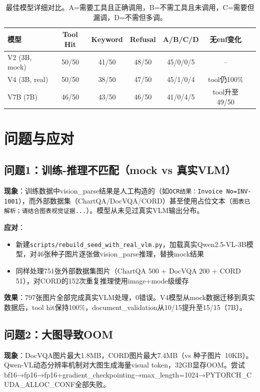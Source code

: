 \documentclass[fontset=none,11pt,a4paper]{ctexart}
\begin{document}
\begin{table}[htbp]
\centering
\begin{tabular}{lcccccl}
\toprule
模型 & Tool Hit & Keyword & Refusal & A/B/C/D & 无enf变化 \\
\midrule
V2 (3B, mock) & 50/50 & 41/50 & 48/50 & 45/0/0/5 & -- \\
V4 (3B, real) & 50/50 & 38/50 & 47/50 & 45/1/0/4 & tool仍100\% \\
V7B (7B) & 46/50 & 43/50 & 46/50 & 41/0/4/5 & tool升至49/50 \\
\bottomrule
\end{tabular}
\caption{最佳模型详细对比。A=需要工具且正确调用，B=不需工具且未调用，C=需要但漏调，D=不需但多调。}
\label{tab:results}
\end{table}

\section{问题与应对}

\subsection{问题1：训练-推理不匹配（mock vs 真实VLM）}

\textbf{现象}：训练数据中vision\_parse结果是人工构造的（如\texttt{OCR结果：Invoice No=INV-1001}），而外部数据集（ChartQA/DocVQA/CORD）甚至使用占位文本（\texttt{图表已解析；请结合图表视觉证据...}）。模型从未见过真实VLM输出分布。

\textbf{应对}：
\begin{itemize}[nosep]
    \item 新建\texttt{scripts/rebuild\_seed\_with\_real\_vlm.py}，加载真实Qwen2.5-VL-3B模型，对46张种子图片逐张做vision\_parse推理，替换mock结果
    \item 同样处理751张外部数据集图片（ChartQA 500 + DocVQA 200 + CORD 51），对CORD的152次重复推理使用image+mode级缓存
\end{itemize}

\textbf{效果}：797张图片全部完成真实VLM处理，0错误。V4模型从mock数据迁移到真实数据后，tool hit保持100\%，document\_validation从10/15提升至15/15（7B）。

\subsection{问题2：大图导致OOM}

\textbf{现象}：DocVQA图片最大1.8MB，CORD图片最大7.4MB（vs 种子图片~10KB）。Qwen-VL动态分辨率机制对大图生成海量visual token，32GB显存OOM。尝试bf16→fp16→fp16+gradient\_checkpointing→max\_length=1024→PYTORCH\_CUDA\_ALLOC\_CONF全部失败。
\end{document}
